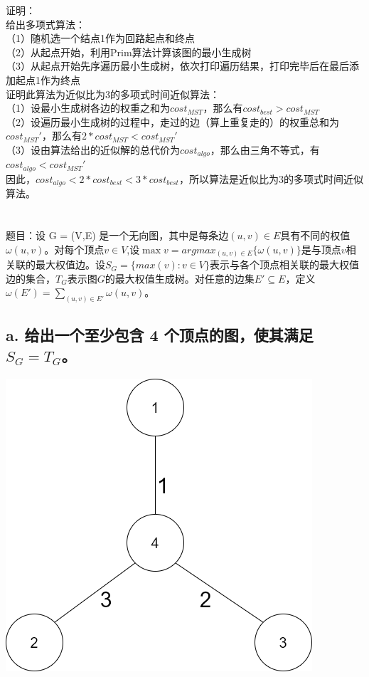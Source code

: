 \documentclass[UTF8]{ctexart}
\begin{document}
证明：\\
给出多项式算法：\\
（1）随机选一个结点1作为回路起点和终点\\
（2）从起点开始，利用Prim算法计算该图的最小生成树\\
（3）从起点开始先序遍历最小生成树，依次打印遍历结果，打印完毕后在最后添加起点1作为终点\\
证明此算法为近似比为3的多项式时间近似算法：\\
（1）设最小生成树各边的权重之和为$cost_{MST}$，那么有$cost_{best}>cost_{MST}$\\
（2）设遍历最小生成树的过程中，走过的边（算上重复走的）的权重总和为$cost_{MST}'$，那么有$2*cost_{MST}<cost_{MST}'$\\
（3）设由算法给出的近似解的总代价为$cost_{algo}$，那么由三角不等式，有$cost_{algo}<cost_{MST}'$\\
因此，$cost_{algo}<2*cost_{best}<3*cost_{best}$，所以算法是近似比为3的多项式时间近似算法。
\section{}
题目：设 G = (V,E) 是一个无向图，其中是每条边$(u,v)\in E$具有不同的权值$\omega(u,v)$。对每个顶点$v\in V$,设$\max{v}=argmax_{(u,v)\in E}\{\omega(u,v)\}$是与顶点$v$相关联的最大权值边。设$S_G=\{max(v):v\in V\}$表示与各个顶点相关联的最大权值边的集合，$T_G$表示图$G$的最大权值生成树。对任意的边集$E'\subseteq E$，定义$\omega(E')=\sum_{(u,v)\in E'}\omega(u,v)$。
\subsection{a. 给出一个至少包含 4 个顶点的图，使其满足 $S_G = T_G$。}
\includegraphics[scale=0.3]{4.png}
\end{document}
